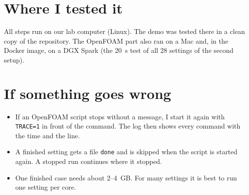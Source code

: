 \section{Where I tested it}
All steps run on our lab computer (Linux). The demo was tested there in a clean copy of the repository. The OpenFOAM part also ran on a
Mac and, in the Docker image, on a DGX Spark (the 20~s test of all 28 settings of the second setup).

\section{If something goes wrong}
\begin{itemize}
  \item If an OpenFOAM script stops without a message, I start it again with \texttt{TRACE=1} in front of the command. The log
        then shows every command with the time and the line.
  \item A finished setting gets a file \texttt{done} and is skipped when the script is started again. A stopped run continues
        where it stopped.
  \item One finished case needs about 2--4~GB. For many settings it is best to run one setting per core.
\end{itemize}
\endgroup
